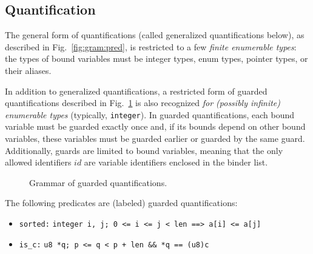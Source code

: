 \subsection*{Quantification}

{\highlightnotimplemented The general form of quantifications (called
    generalized quantifications below), as described in
    Fig.~\ref{fig:gram:pred},
    is restricted to a few \emph{finite enumerable types}: the types of bound
    variables must be \C integer types, enum types, pointer types, or their
    aliases.

}

In addition to generalized quantifications, a restricted form of guarded
quantifications described in Fig.~\ref{fig:gram:guarded} is also recognized
\emph{for (possibly infinite) enumerable types} (typically,
\lstinline|integer|). In guarded quantifications, each bound variable must be
guarded exactly once and, if its bounds depend on other bound variables, these
variables must be guarded earlier or guarded by the same guard. Additionally,
guards are limited to bound variables, meaning that the only allowed
identifiers $id$ are variable identifiers enclosed in the binder list.

\begin{figure}[htbp]
  \begin{cadre}
    
  \end{cadre}
  \caption{Grammar of guarded quantifications.}
  \label{fig:gram:guarded}
\end{figure}


\begin{example}
  The following predicates are (labeled) guarded quantifications:
  \begin{itemize}
  \item \lstinline|sorted:| \Forall{} \lstinline|integer i, j; 0 <= i <= j < len ==> a[i] <= a[j]|
  \item {\highlightnotimplemented \lstinline|is_c:| \Exists{} \lstinline|u8 *q; p <= q < p + len && *q == (u8)c|}
  \end{itemize}
\end{example}


